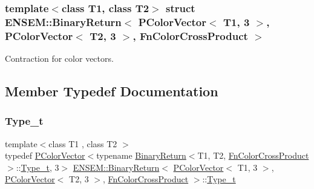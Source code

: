 \subsubsection*{template$<$class T1, class T2$>$\newline
struct E\+N\+S\+E\+M\+::\+Binary\+Return$<$ P\+Color\+Vector$<$ T1, 3 $>$, P\+Color\+Vector$<$ T2, 3 $>$, Fn\+Color\+Cross\+Product $>$}

Contraction for color vectors. 

\subsection{Member Typedef Documentation}
\mbox{\label{structENSEM_1_1BinaryReturn_3_01PColorVector_3_01T1_00_013_01_4_00_01PColorVector_3_01T2_00_013_ba40478e41b9dc719d7fd5b6b54bac05_a1ee2bf6b3057b787867e31a8bafe80a6}} 
\subsubsection{\texorpdfstring{Type\_t}{Type\_t}\hspace{0.1cm}{\footnotesize\ttfamily [1/3]}}
{\footnotesize\ttfamily template$<$class T1 , class T2 $>$ \\
typedef \mbox{\hyperlink{classENSEM_1_1PColorVector}{P\+Color\+Vector}}$<$typename \mbox{\hyperlink{structENSEM_1_1BinaryReturn}{Binary\+Return}}$<$T1, T2, \mbox{\hyperlink{structENSEM_1_1FnColorCrossProduct}{Fn\+Color\+Cross\+Product}}$>$\+::\mbox{\hyperlink{structENSEM_1_1BinaryReturn_3_01PColorVector_3_01T1_00_013_01_4_00_01PColorVector_3_01T2_00_013_ba40478e41b9dc719d7fd5b6b54bac05_a1ee2bf6b3057b787867e31a8bafe80a6}{Type\+\_\+t}}, 3$>$ \mbox{\hyperlink{structENSEM_1_1BinaryReturn}{E\+N\+S\+E\+M\+::\+Binary\+Return}}$<$ \mbox{\hyperlink{classENSEM_1_1PColorVector}{P\+Color\+Vector}}$<$ T1, 3 $>$, \mbox{\hyperlink{classENSEM_1_1PColorVector}{P\+Color\+Vector}}$<$ T2, 3 $>$, \mbox{\hyperlink{structENSEM_1_1FnColorCrossProduct}{Fn\+Color\+Cross\+Product}} $>$\+::\mbox{\hyperlink{structENSEM_1_1BinaryReturn_3_01PColorVector_3_01T1_00_013_01_4_00_01PColorVector_3_01T2_00_013_ba40478e41b9dc719d7fd5b6b54bac05_a1ee2bf6b3057b787867e31a8bafe80a6}{Type\+\_\+t}}}

